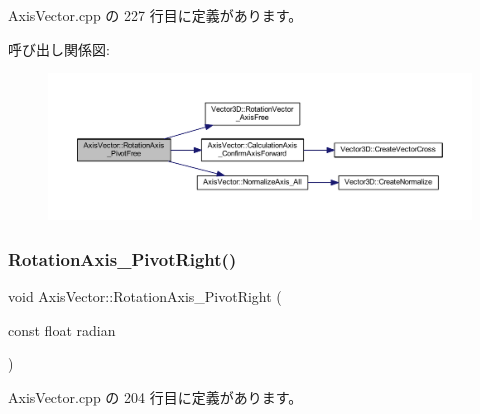  Axis\+Vector.\+cpp の 227 行目に定義があります。

呼び出し関係図\+:
\nopagebreak
\begin{figure}[H]
\begin{center}
\leavevmode
\includegraphics[width=350pt]{class_axis_vector_a7cab74dd54bf4fc97770aee2278f2fa4_cgraph}
\end{center}
\end{figure}
\mbox{\label{class_axis_vector_a71a7638817a488d824cdc757d4e28a0c}} 
\subsubsection{\texorpdfstring{Rotation\+Axis\+\_\+\+Pivot\+Right()}{RotationAxis\_PivotRight()}}
{\footnotesize\ttfamily void Axis\+Vector\+::\+Rotation\+Axis\+\_\+\+Pivot\+Right (\begin{DoxyParamCaption}\item[{const float}]{radian }\end{DoxyParamCaption})}



 Axis\+Vector.\+cpp の 204 行目に定義があります。

